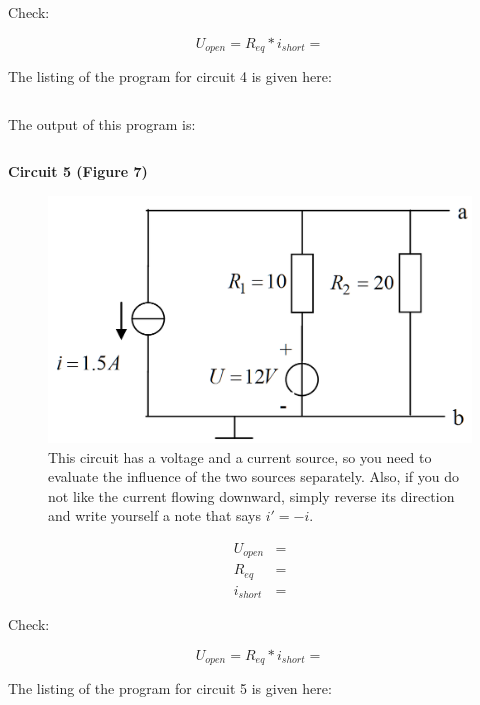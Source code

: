 \documentclass[11pt,letterpaper]{article}
\begin{document}
Check:

\begin{equation}
U_{open} = R_{eq} * i_{short} =
\end{equation}

\newpage
The listing of the program for circuit 4 is given here:

\begin{lstlisting}
\end{lstlisting}


The output of this program is:

\begin{lstlisting}
\end{lstlisting}

\newpage
\textbf{Circuit 5 (Figure 7)}

\begin{figure}
\centering
\includegraphics[width=0.65\linewidth]{HW_Thevenin5}
\caption{This circuit has a voltage and a current source, so you need to evaluate the influence of the two sources separately. Also, if you do not like the current flowing downward, simply reverse its direction and write yourself a note that says $i' = -i$.}
\label{fig:HW_Thevenin5}
\end{figure}

\begin{align}\label{Eqn:HW_Thevenin7}
U_{open} &=  \\
R_{eq}  &=  \\
i_{short} &=
\end{align}

Check:

\begin{equation}
U_{open} = R_{eq} * i_{short} =  
\end{equation}

\newpage
The listing of the program for circuit 5 is given here:

\begin{lstlisting}
\end{lstlisting}
\end{document}
